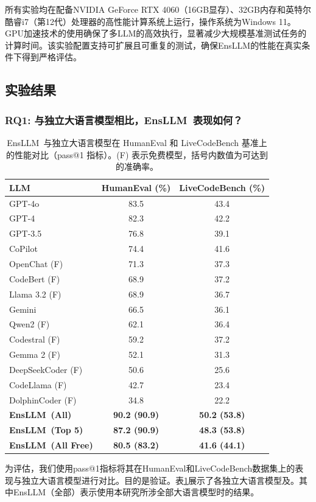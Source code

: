 \documentclass{article}
\newcommand{\tool}{EnsLLM}
\begin{document}
所有实验均在配备NVIDIA GeForce RTX 4060（16GB显存）、32GB内存和英特尔酷睿i7（第12代）处理器的高性能计算系统上运行，操作系统为Windows 11。GPU加速技术的使用确保了多LLM的高效执行，显著减少大规模基准测试任务的计算时间。该实验配置支持可扩展且可重复的测试，确保\tool 的性能在真实条件下得到严格评估。
\subsection{实验结果}

\subsubsection{RQ1: 与独立大语言模型相比，\tool\ 表现如何？}
\begin{table}[t!]
    \centering
    \caption{\tool\ 与独立大语言模型在 HumanEval 和 LiveCodeBench 基准上的性能对比（pass@1 指标）。(F) 表示免费模型，括号内数值为可达到的准确率。}
    \label{tab:elfcg_performance}
    \begin{tabular}{|l|c|c|}
        \hline
        \textbf{LLM} & \textbf{HumanEval (\%)} & \textbf{LiveCodeBench (\%)} \\
        \hline
        GPT-4o         & 83.5  & 43.4  \\
        GPT-4          & 82.3  & 42.2  \\
        GPT-3.5        & 76.8  & 39.1  \\
        CoPilot        & 74.4  & 41.6  \\
        OpenChat (F)      & 71.3  & 37.3  \\
        CodeBert (F)      & 68.9  & 37.2  \\
        Llama 3.2 (F)     & 68.9  & 36.7  \\
        Gemini         & 66.5  & 36.1  \\
        Qwen2 (F)         & 62.1  & 36.4  \\
        Codestral (F)     & 59.2  & 37.2  \\
        Gemma 2  (F)      & 52.1  & 31.3  \\
        DeepSeekCoder (F)  & 50.6  & 25.6  \\
        CodeLlama  (F)     & 42.7  & 23.4  \\
        DolphinCoder (F)   & 34.8  & 22.2  \\
        \hline
        \textbf{\tool\ (All)} & \textbf{90.2 (90.9)} & \textbf{50.2 (53.8)} \\
        \hline
        \textbf{\tool\ (Top 5)} & \textbf{87.2 (90.9)} & \textbf{48.3 (53.8)} \\
        \hline
        \textbf{\tool\ (All Free)} & \textbf{80.5 (83.2)} & \textbf{41.6 (44.1)} \\
        \hline
    \end{tabular}
\end{table}
\leavevmode\par
为评估，我们使用pass@1指标将其在HumanEval和LiveCodeBench数据集上的表现与独立大语言模型进行对比。目的是验证。表\ref{tab:elfcg_performance}展示了各独立大语言模型及。其中\tool（全部）表示使用本研究所涉全部大语言模型时的结果。
\end{document}
